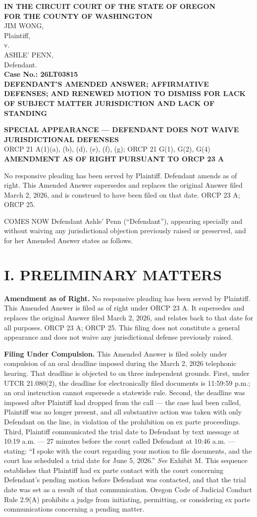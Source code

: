 \documentclass[12pt,letterpaper]{article}
\newcommand{\oregoncaption}[5]{%
\noindent
\textbf{IN THE CIRCUIT COURT OF THE STATE OF OREGON} \\
\textbf{FOR THE COUNTY OF #1} \\
\vspace{0.2in}
\noindent #2, \\
\quad Plaintiff, \\
v. \\
#3, \\
\quad Defendant. \\
\vspace{0.1in}
\noindent \textbf{Case No.: #4} \\
\vspace{0.1in}
\noindent \textbf{#5} \\
\vspace{0.1in}
}
\begin{document}
\oregoncaption{WASHINGTON}{JIM WONG}{ASHLE' PENN}{26LT03815}{DEFENDANT'S AMENDED ANSWER; AFFIRMATIVE DEFENSES; AND RENEWED MOTION TO DISMISS FOR LACK OF SUBJECT MATTER JURISDICTION AND LACK OF STANDING}

\begin{center}
\textbf{SPECIAL APPEARANCE --- DEFENDANT DOES NOT WAIVE JURISDICTIONAL DEFENSES} \\
ORCP 21 A(1)(a), (b), (d), (e), (f), (g); ORCP 21 G(1), G(2), G(4) \\
\textbf{AMENDMENT AS OF RIGHT PURSUANT TO ORCP 23 A}
\end{center}

No responsive pleading has been served by Plaintiff. Defendant amends as of right. This Amended Answer supersedes and replaces the original Answer filed March 2, 2026, and is construed to have been filed on that date. ORCP 23 A; ORCP 25.

COMES NOW Defendant Ashle' Penn (``Defendant''), appearing specially and without waiving any jurisdictional objection previously raised or preserved, and for her Amended Answer states as follows.

\section*{I. PRELIMINARY MATTERS}

\textbf{Amendment as of Right.} No responsive pleading has been served by Plaintiff. This Amended Answer is filed as of right under ORCP 23 A. It supersedes and replaces the original Answer filed March 2, 2026, and relates back to that date for all purposes. ORCP 23 A; ORCP 25. This filing does not constitute a general appearance and does not waive any jurisdictional defense previously raised.

\textbf{Filing Under Compulsion.} This Amended Answer is filed solely under compulsion of an oral deadline imposed during the March 2, 2026 telephonic hearing. That deadline is objected to on three independent grounds. First, under UTCR 21.080(2), the deadline for electronically filed documents is 11:59:59 p.m.; an oral instruction cannot supersede a statewide rule. Second, the deadline was imposed after Plaintiff had dropped from the call --- the case had been called, Plaintiff was no longer present, and all substantive action was taken with only Defendant on the line, in violation of the prohibition on ex parte proceedings. Third, Plaintiff communicated the trial date to Defendant by text message at 10:19 a.m. --- 27 minutes before the court called Defendant at 10:46 a.m. --- stating: ``I spoke with the court regarding your motion to file documents, and the court has scheduled a trial date for June 5, 2026.'' \textit{See} Exhibit M. This sequence establishes that Plaintiff had ex parte contact with the court concerning Defendant's pending motion before Defendant was contacted, and that the trial date was set as a result of that communication. Oregon Code of Judicial Conduct Rule 2.9(A) prohibits a judge from initiating, permitting, or considering ex parte communications concerning a pending matter.
\end{document}
